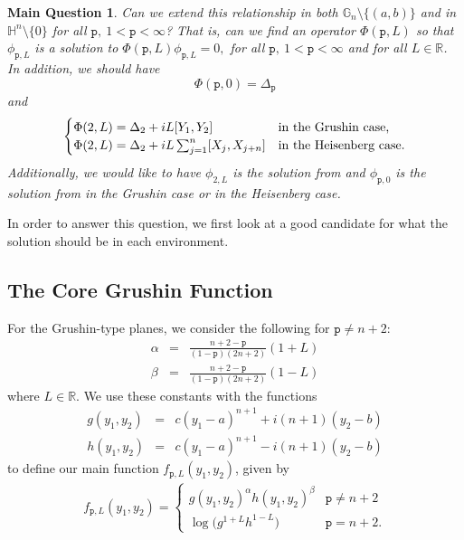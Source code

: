 \documentclass[12pt]{amsart}
\theoremstyle{plain}
\newtheorem*{quest}{Main Question}
\theoremstyle{definition}
\numberwithin{equation}{section}
\begin{document}
\begin{quest}
Can we extend this relationship in both $\mathbb{G}_n\setminus\{(a,b)\}$ and in $\mathbb{H}^n\setminus\{0\}$ for all ${\texttt{p}},\ 1<{\texttt{p}} < \infty$?  That is, can we find an operator $\Phi({\texttt{p}},L)$ so that $\phi_{{\texttt{p}},L}$ is a solution to $\Phi({\texttt{p}},L)\phi_{{\texttt{p}},L}=0,$ for all ${\texttt{p}},\ 1<{\texttt{p}} < \infty$ and for all $L \in \mathbb{R}$.  In addition, we should have 
\begin{equation}
\Phi({\texttt{p}},0)  = \Delta_{\texttt{p}}  \label{condition2}
\end{equation}
and
\begin{eqnarray} \begin{cases}
\Phi(2,L) = \Delta_2+iL[Y_1,Y_2] & \textmd{in the Grushin case,}\\ 
\Phi(2,L)= \Delta_2+iL\sum_{j=1}^{n}[X_j,X_{j+n}] & \textmd{in the Heisenberg case.} 
\end{cases}\label{condition1}
\end{eqnarray}
Additionally, we would like to have $\phi_{2,L}$ is the solution from \cite{BGG} and $\phi_{{\texttt{p}}, 0}$ is the solution from \cite{BG} in the Grushin case or \cite{CDG} in the Heisenberg case.  
\end{quest}

In order to answer this question, we first look at a good candidate for what the solution should be in each environment.
\subsection{The Core Grushin Function}
For the Grushin-type planes, we consider the following for ${\texttt{p}}\neq n+2$:
\begin{eqnarray*}
\alpha & = & \frac{n+2-{\texttt{p}}}{(1-{\texttt{p}})(2n+2)}(1+L)\\
\beta & = & \frac{n+2-{\texttt{p}}}{(1-{\texttt{p}})(2n+2)}(1-L)
\end{eqnarray*}
where $L\in\mathbb{R}$.
We use these constants with the functions
\begin{eqnarray*}
g(y_1,y_2) & = & c(y_1-a)^{n+1}+i(n+1)(y_2-b)\\ 
h(y_1,y_2) & = & c(y_1-a)^{n+1}-i(n+1)(y_2-b)
\end{eqnarray*}
to define our main function $f_{{\texttt{p}},L}(y_1,y_2)$, given by
\begin{eqnarray*}
f_{{\texttt{p}},L}(y_1,y_2) =\left\{\begin{array}{cc}
g(y_1,y_2)^{\alpha}h(y_1,y_2)^{\beta} & {\texttt{p}} \neq n+2 \\
\log\big(g^{1+L}h^{1-L}\big) & {\texttt{p}} = n+2.
\end{array}\right.
\end{eqnarray*}
\end{document}
